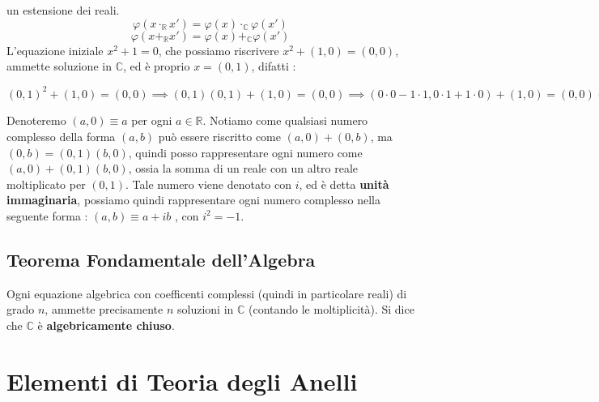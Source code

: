 \documentclass[12pt, letterpaper]{article}
\begin{document}
un estensione dei reali.\begin{equation}
    \varphi(x\cdot_{\mathbb{R}} x')=\varphi(x)\cdot_{\mathbb{C}}\varphi(x')
\end{equation}\begin{equation}
    \varphi(x+_{\mathbb{R}} x')=\varphi(x)+_{\mathbb{C}} \varphi(x')
\end{equation}
L'equazione iniziale \(x^2+1=0\), che possiamo riscrivere \(x^2+(1,0)=(0,0)\), ammette soluzione in \(\mathbb{C}\),
ed è proprio \(x=(0,1)\), difatti : 
\begin{center}
    \(
        (0,1)^2+(1,0)=(0,0)\implies(0,1)(0,1)+(1,0)=(0,0)\implies(0\cdot 0 - 1\cdot 1,0\cdot 1 + 1\cdot 0)+(1,0)=(0,0)
        \implies(-1,0)+(1,0)=(0,0)\implies (-1+1,0)=(0,0)\implies (0,0)=(0,0) \checkmark
    \)
\end{center}
Denoteremo \((a,0)\equiv a\) per ogni \(a\in \mathbb{R}\). Notiamo come qualsiasi numero complesso della forma 
\((a,b)\) può essere riscritto come \((a,0)+(0,b)\), ma \((0,b)=(0,1)(b,0)\), quindi posso rappresentare ogni numero 
come \((a,0)+(0,1)(b,0)\), ossia la somma di un reale con un altro reale moltiplicato per \((0,1)\). Tale numero viene 
denotato con \(i\), ed è detta \textbf{unità immaginaria}, possiamo quindi rappresentare ogni numero complesso nella seguente 
forma : \((a,b)\equiv a+ib\) , con \(i^2=-1\).
\subsection{Teorema Fondamentale dell'Algebra}
Ogni equazione algebrica con coefficenti complessi (quindi in particolare reali) di grado \(n\), ammette 
precisamente \(n\) soluzioni in \(\mathbb{C}\) (contando le moltiplicità). Si dice che \(\mathbb{C}\) è 
\textbf{algebricamente chiuso}.
\section{Elementi di Teoria degli Anelli}\label{TeoriaAnelli}
\end{document}
